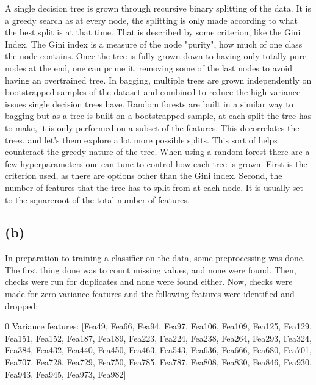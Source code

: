 \documentclass[12pt]{report} %
\begin{document}
A single decision tree is grown through recursive binary splitting of the data. It is a greedy search as at every node, the splitting is only made according to what the best split is at that time\cite[pp. 337-338]{james2013introduction}. That is described by some criterion, like the Gini Index. The Gini index is a measure of the node "purity", how much of one class the node contains\cite[pp. 338-339]{james2013introduction}. Once the tree is fully grown down to having only totally pure nodes at the end, one can prune it, removing some of the last nodes to avoid having an overtrained tree. In bagging, multiple trees are grown independently on bootstrapped samples of the dataset and combined to reduce the high variance issues single decision trees have\cite[p. 343]{james2013introduction}. Random forests are built in a similar way to bagging but as a tree is built on a bootstrapped sample, at each split the tree has to make, it is only performed on a subset of the features. This decorrelates the trees, and let's them explore a lot more possible splits\cite[354]{james2013introduction}. This sort of helps counteract the greedy nature of the tree. When using a random forest there are a few hyperparameters one can tune to control how each tree is grown. First is the criterion used, as there are options other than the Gini index. Second, the number of features that the tree has to split from at each node. It is usually set to the squareroot of the total number of features.

\subsection*{(b)}

In preparation to training a classifier on the data, some preprocessing was done. The first thing done was to count missing values, and none were found. Then, checks were run for duplicates and none were found either. Now, checks were made for zero-variance features and the following features were identified and dropped:

\begin{center}
    0 Variance features: [Fea49, Fea66, Fea94, Fea97, Fea106, Fea109, Fea125, Fea129, Fea151, Fea152, Fea187, Fea189, Fea223, Fea224, Fea238, Fea264, Fea293, Fea324, Fea384, Fea432, Fea440, Fea450, Fea463, Fea543, Fea636, Fea666, Fea680, Fea701, Fea707, Fea728, Fea729, Fea750, Fea785, Fea787, Fea808, Fea830, Fea846, Fea930, Fea943, Fea945, Fea973, Fea982]
\end{center}
\end{document}
